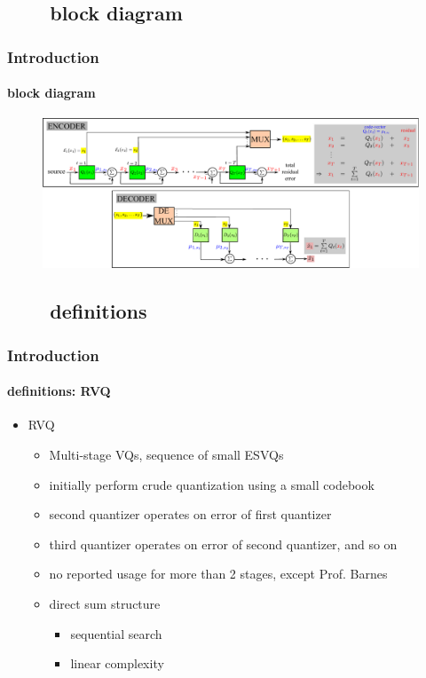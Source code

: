 \subsection{\ \ \ \ block diagram}
\begin{frame}[plain]
\frametitle{Introduction}
\framesubtitle{block diagram}
\logoCSIPCPL\mypagenum
	\begin{changemargin}{-1.3in}{0in}
		\begin{figure}				
			\includegraphics[width=1.3\textwidth]{figs/RVQ_blockDiagram.pdf}
		\end{figure}
	\end{changemargin}
\end{frame}


\subsection{\ \ \ \ definitions}
\begin{frame}
\frametitle{Introduction}
\framesubtitle{definitions: RVQ}
\logoCSIPCPL\mypagenum
	\begin{itemize}
		\item {\color{red}RVQ} 
			\begin{itemize}
				\item Multi-stage VQs, sequence of small ESVQs
				\item initially perform crude quantization using a small codebook
				\item second quantizer operates on error of first quantizer
				\item third quantizer operates on error of second quantizer, and so on
				\item no reported usage for more than 2 stages, except Prof. Barnes
				\item {\color{blue}direct sum structure} 
					\begin{itemize}
						\item sequential search
						\item linear complexity
					\end{itemize}
			\end{itemize}
	\end{itemize}
\end{frame}



